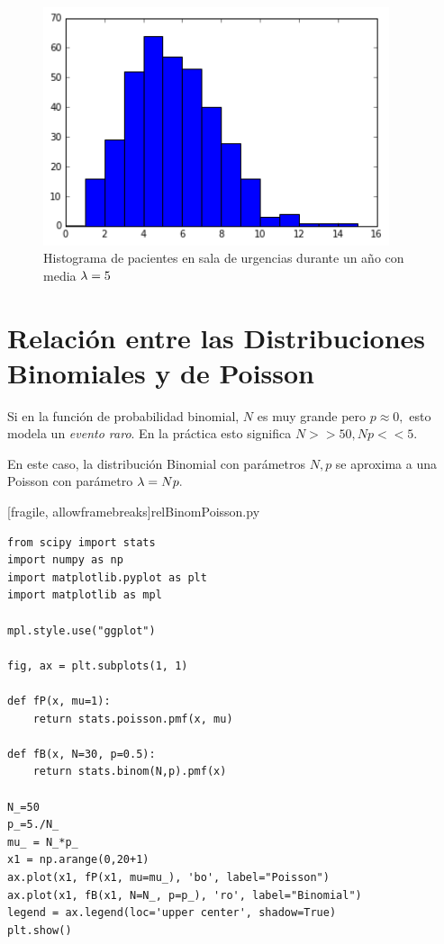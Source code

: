 \begin{figure}[h]
 \centering
 \includegraphics[height=7cm,keepaspectratio=true]{./pe/distPoisson1.png}
 \caption{Histograma de pacientes en sala de urgencias durante un año con media $\lambda=5$}
 \label{fig:distPoisson1}
\end{figure}



\section{Relación entre las Distribuciones Binomiales y de Poisson}

 Si en la función de probabilidad binomial, $N$ es muy grande pero $p \approx 0,$ esto modela un \emph{evento raro}.  En la práctica esto significa $N>>50, Np<<5.$ 

 En este caso, la distribución Binomial con parámetros $N,p$ se aproxima a una Poisson con parámetro $\lambda = Np.$

[fragile, allowframebreaks]{relBinomPoisson.py}
 \begin{verbatim}
from scipy import stats
import numpy as np
import matplotlib.pyplot as plt
import matplotlib as mpl

mpl.style.use("ggplot")

fig, ax = plt.subplots(1, 1)

def fP(x, mu=1):
    return stats.poisson.pmf(x, mu)

def fB(x, N=30, p=0.5):
    return stats.binom(N,p).pmf(x)

N_=50
p_=5./N_
mu_ = N_*p_
x1 = np.arange(0,20+1)
ax.plot(x1, fP(x1, mu=mu_), 'bo', label="Poisson")
ax.plot(x1, fB(x1, N=N_, p=p_), 'ro', label="Binomial")
legend = ax.legend(loc='upper center', shadow=True)
plt.show()

 \end{verbatim}



